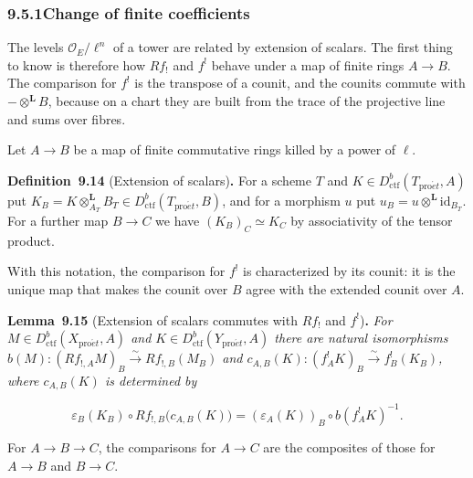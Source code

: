 \documentclass[11pt]{article}
\newenvironment{bpstatement}[2]{\par\addvspace{0.6\baselineskip}\noindent\textbf{#1}#2\textbf{.}\enspace\ignorespaces}
  {\par\addvspace{0.4\baselineskip}}
\newenvironment{bpstatementit}[2]{\begin{bpstatement}{#1}{#2}\itshape\ignorespaces}{\end{bpstatement}}
\begin{document}
\subsubsection*{\texorpdfstring{9.5.1\quad Change of finite coefficients}{9.5.1 Change of finite coefficients}}
\label{bp43}%
\label{bp44}%
The levels \(\mathcal O_E/\ell^n\) of a tower are related by extension of scalars. The first thing to know is therefore how \(Rf_!\) and \(f^!\) behave under a map of finite rings \(A\to B\). The comparison for \(f^!\) is the transpose of a counit, and the counits commute with \(-\otimes^{\mathbf L}B\), because on a chart they are built from the trace of the projective line and sums over fibres.

Let \(A\to B\) be a map of finite commutative rings killed by a power of \(\ell\).

\label{bp45}%
\begin{bpstatement}{Definition~9.14}{ (Extension of scalars)}
For a scheme \(T\) and \(K\in D^b_{\mathrm{ctf}}(T_{\mathrm{pro}\acute{e}t},A)\) put \(K_B=K\otimes^{\mathbf L}_{A_T}B_T\in D^b_{\mathrm{ctf}}(T_{\mathrm{pro}\acute{e}t},B)\), and for a morphism \(u\) put \(u_B=u\otimes^{\mathbf L}\mathrm{id}_{B_T}\). For a further map \(B\to C\) we have \((K_B)_C\simeq K_C\) by associativity of the tensor product.
\end{bpstatement}

\label{bp46}%
With this notation, the comparison for \(f^!\) is characterized by its counit: it is the unique map that makes the counit over \(B\) agree with the extended counit over \(A\).

\label{bp47}%
\begin{bpstatementit}{Lemma~9.15}{ (Extension of scalars commutes with $Rf_!$ and $f^!$)}
For \(M\in D^b_{\mathrm{ctf}}(X_{\mathrm{pro}\acute{e}t},A)\) and \(K\in D^b_{\mathrm{ctf}}(Y_{\mathrm{pro}\acute{e}t},A)\) there are natural isomorphisms \(b(M):(Rf_{!,A}M)_B\xrightarrow{\sim}Rf_{!,B}(M_B)\) and \(c_{A,B}(K):(f_A^!K)_B\xrightarrow{\sim}f_B^!(K_B)\), where \(c_{A,B}(K)\) is determined by

\[
\varepsilon_B(K_B)\circ Rf_{!,B}\bigl(c_{A,B}(K)\bigr)
=(\varepsilon_A(K))_B\circ b(f_A^!K)^{-1}.
\tag{9.16}
\]

For \(A\to B\to C\), the comparisons for \(A\to C\) are the composites of those for \(A\to B\) and \(B\to C\).
\end{bpstatementit}
\end{document}
